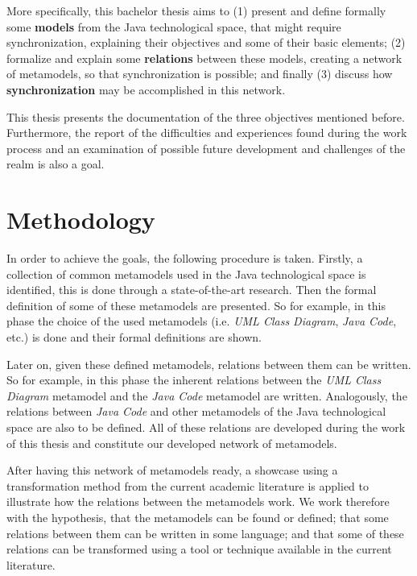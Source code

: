 \documentclass[tuberlin,cic,tc,english,noabntcite,oneside]{iiufrgs}
\begin{document}
More specifically, this bachelor thesis aims to (1) present and define formally some \textbf{models} from the Java technological space, that might require synchronization, explaining their objectives and some of their basic elements; (2) formalize and explain some  \textbf{relations} between these models, creating a network of metamodels, so that synchronization is possible; and finally (3) discuss how \textbf{synchronization} may be accomplished in this network.

This thesis presents the documentation of the three objectives mentioned before. Furthermore, the report of the difficulties and experiences found during the work process and an examination of possible future development and challenges of the realm is also a goal.

\section{Methodology}
In order to achieve the goals, the following procedure is taken. Firstly, a collection of common metamodels used in the Java technological space is identified, this is done through a state-of-the-art research. Then the formal definition of some of these metamodels are presented. So for example, in this phase the choice of the used metamodels (i.e. \emph{UML Class Diagram}, \emph{Java Code}, etc.) is done and their formal definitions are shown.

Later on, given these defined metamodels, relations between them can be written. So for example, in this phase the inherent relations between the \emph{UML Class Diagram} metamodel and the \emph{Java Code} metamodel are written. Analogously, the relations between \emph{Java Code} and other metamodels of the Java technological space are also to be defined. All of these relations are developed during the work of this thesis and constitute our developed network of metamodels.

After having this network of metamodels ready, a showcase using a transformation method from the current academic literature is applied to illustrate how the relations between the metamodels work. We work therefore with the hypothesis, that the metamodels can be found or defined; that some relations between them can be written in some language; and that some of these relations can be transformed using a tool or technique available in the current literature.
\end{document}

